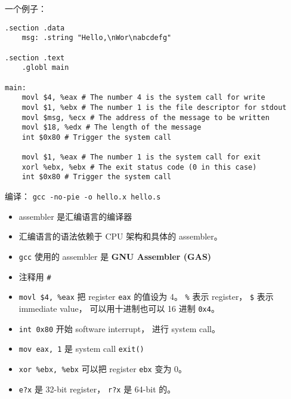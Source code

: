 
\begin{issues}
\issueDraft
\end{issues}

一个例子：
\begin{lstlisting}[language=none]
.section .data
    msg: .string "Hello,\nWor\nabcdefg"

.section .text
    .globl main

main:
    movl $4, %eax # The number 4 is the system call for write
    movl $1, %ebx # The number 1 is the file descriptor for stdout
    movl $msg, %ecx # The address of the message to be written
    movl $18, %edx # The length of the message
    int $0x80 # Trigger the system call

    movl $1, %eax # The number 1 is the system call for exit
    xorl %ebx, %ebx # The exit status code (0 in this case)
    int $0x80 # Trigger the system call
\end{lstlisting}

编译： \verb|gcc -no-pie -o hello.x hello.s|

\begin{itemize}
\item assembler 是汇编语言的编译器
\item 汇编语言的语法依赖于 CPU 架构和具体的 assembler。
\item \verb|gcc| 使用的 assembler 是 \textbf{GNU Assembler (GAS)}
\item 注释用 \verb|#|
\item \verb|movl $4, %eax| 把 register \verb|eax| 的值设为 4。 \verb|%| 表示 register， \verb|$| 表示 immediate value， 可以用十进制也可以 16 进制 \verb|0x4|。
\item \verb|int 0x80| 开始 software interrupt， 进行 system call。
\item \verb|mov eax, 1| 是 system call \verb|exit()|
\item \verb|xor %ebx, %ebx| 可以把 register \verb|ebx| 变为 0。
\item \verb|e?x| 是 32-bit register， \verb|r?x| 是 64-bit 的。
\end{itemize}
